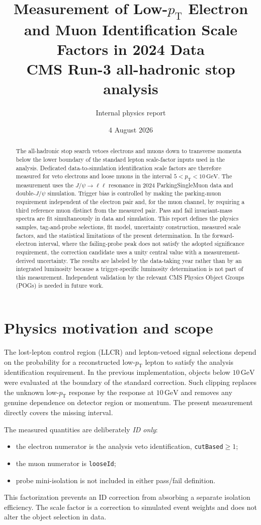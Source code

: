 \documentclass[11pt,a4paper]{article}
\title{\vspace{-12mm}\color{darkblue}\textbf{Measurement of Low-$p_{\mathrm{T}}$ Electron and Muon Identification Scale Factors in 2024 Data}\\[3mm]
\large CMS Run-3 all-hadronic stop analysis}
\author{Internal physics report}
\date{4 August 2026}
\newcommand{\pt}{p_{\mathrm{T}}}
\begin{document}
\maketitle

\begin{abstract}
The all-hadronic stop search vetoes electrons and muons down to transverse momenta below the lower boundary of the standard lepton scale-factor inputs used in the analysis.  Dedicated data-to-simulation identification scale factors are therefore measured for veto electrons and loose muons in the interval $5<\pt<10\,\mathrm{GeV}$.  The measurement uses the $J/\psi\to\ell\ell$ resonance in 2024 ParkingSingleMuon data and double-$J/\psi$ simulation.  Trigger bias is controlled by making the parking-muon requirement independent of the electron pair and, for the muon channel, by requiring a third reference muon distinct from the measured pair.  Pass and fail invariant-mass spectra are fit simultaneously in data and simulation.  This report defines the physics samples, tag-and-probe selections, fit model, uncertainty construction, measured scale factors, and the statistical limitations of the present determination.  In the forward-electron interval, where the failing-probe peak does not satisfy the adopted significance requirement, the correction candidate uses a unity central value with a measurement-derived uncertainty.  The results are labeled by the data-taking year rather than by an integrated luminosity because a trigger-specific luminosity determination is not part of this measurement.  Independent validation by the relevant CMS Physics Object Groups (POGs) is needed in future work.
\end{abstract}

\section{Physics motivation and scope}

The lost-lepton control region (LLCR) and lepton-vetoed signal selections depend on the probability for a reconstructed low-$\pt$ lepton to satisfy the analysis identification requirement.  In the previous implementation, objects below $10\,\mathrm{GeV}$ were evaluated at the boundary of the standard correction.  Such clipping replaces the unknown low-$\pt$ response by the response at $10\,\mathrm{GeV}$ and removes any genuine dependence on detector region or momentum.  The present measurement directly covers the missing interval.

The measured quantities are deliberately \emph{ID only}:
\begin{itemize}[leftmargin=6mm,itemsep=1mm]
  \item the electron numerator is the analysis veto identification, \texttt{cutBased}$\geq1$;
  \item the muon numerator is \texttt{looseId};
  \item probe mini-isolation is not included in either pass/fail definition.
\end{itemize}
This factorization prevents an ID correction from absorbing a separate isolation efficiency.  The scale factor is a correction to simulated event weights and does not alter the object selection in data.
\end{document}
